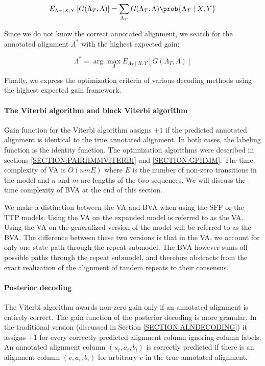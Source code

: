 \begin{equation}
E_{\Lambda_T\mid X, Y}\left[G(\Lambda_T, \Lambda)\right] = 
\sum_{\Lambda_T}G(\Lambda_T, \Lambda)\prob{\Lambda_T\mid X, Y}
\end{equation}

Since we do not know the correct annotated alignment, we search for the
annotated alignment $\Lambda^*$ with the highest expected gain:

\begin{equation}
\Lambda^* = \arg\max_{\Lambda}
E_{\Lambda_T\mid X, Y}\left[G(\Lambda_T, \Lambda)\right]
\end{equation}

Finally, we express the optimization criteria of various decoding methods using
the highest expected gain framework.

\paragraph{The Viterbi algorithm and block Viterbi algorithm} Gain function for
the Viterbi algorithm assigns $+1$ if the predicted annotated alignment is
identical to the true annotated alignment. In both cases, the labeling function
is the identity function. The optimization algorithms were described in
sections \ref{SECTION:PAIRHMMVITERBI} and \ref{SECTION:GPHMM}. The time
complexity of VA is $O(nmE)$ where $E$ is the number of non-zero transitions in
the model and $n$ and $m$ are lengths of the two sequences. We will discuss the
time complexity of BVA at the end of this section.

We make a distinction between the VA and BVA when using the SFF or the TTP
models. Using the VA on the expanded model is referred to as the VA. Using the
VA on the generalized version of the model will be referred to as the BVA. The
difference between these two versions is that in the VA, we account for only
one state path through the repeat submodel. The BVA however sums all possible
paths through the repeat submodel, and therefore abstracts from the exact
realization of the alignment of tandem repeats to their consensus.

\paragraph{Posterior decoding}
The Viterbi algorithm awards non-zero gain only if an annotated alignment is
entirely correct. The gain function of the posterior decoding is more granular.
In the traditional version (discussed in Section \ref{SECTION:ALNDECODING}) it
assigns $+1$ for every correctly predicted alignment column ignoring column
labels. An annotated alignment column $(u_i, a_i, b_i)$ is correctly predicted
if there is an alignment column $(v, a_i, b_i)$ for arbitrary $v$ in the true
annotated alignment. 

